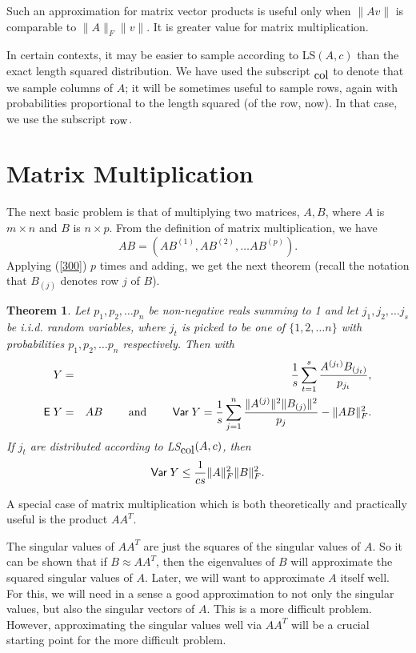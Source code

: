 \documentclass{book}
\newtheorem{theorem}{Theorem}[chapter]
\numberwithin{exercise}{chapter}
\begin{document}
Such an approximation for matrix vector products is useful only when $\|Av\|$ is comparable to
$\|A\|_F\|v\|$. It is greater value for matrix multiplication.

In certain contexts, it may be easier to sample
according to LS$(A,c)$ than the exact length squared distribution. We have used the subscript
$_{\hbox{col}}$ to denote that we sample columns of $A$; it will be sometimes useful to
sample rows, again with probabilities proportional to the length squared (of the row, now).
In that case, we use the subscript $_{\hbox{row}}$.


\section{Matrix Multiplication}

The next basic problem is that of multiplying two matrices, $A,B$, where
$A$ is $m\times n$ and $B$ is $n\times p$. From the definition of matrix multiplication, we have
$$AB=\left( AB^{(1)},AB^{(2)},\ldots AB^{(p)}\right).$$
Applying (\ref{300}) $p$ times and adding, we get the next theorem (recall the notation that
$B_{(j)}$ denotes row $j$ of $B$).
\begin{theorem}\label{matrixmult}
Let $p_1,p_2,\ldots p_n$
be non-negative reals summing to 1 and let $j_1,j_2,\ldots j_s$ be i.i.d. random variables,
where $j_t$ is picked to be one of $\{ 1,2,\ldots n\}$ with probabilities $p_1,p_2,\ldots
p_n$ respectively. Then with
\begin{eqnarray}
Y&=&{1\over s} \sum_{t=1}^s {A^{(j_t)}B_{(j_t)}\over p_{j_t}},\nonumber\\
\hbox{{\sf E}\;} Y&=&AB\qquad \mbox{ and }\qquad \hbox{\sf Var\;} Y= {1\over s}\sum_{j=1}^n {\|A^{(j)}\|^2\|B_{(j)}\|^2\over p_j} - \|AB\|_F^2.\label{400}
\end{eqnarray}
If $j_t$ are distributed according to LS$_{\hbox{col}}(A,c)$, then
$$\hbox{\sf Var\;} Y\leq {1\over cs} \|A\|_F^2\|B\|_F^2.$$
\end{theorem}


A special case of matrix multiplication which is both theoretically and practically useful
is the product $AA^T$.


The singular values of $AA^T$ are just the squares of the singular values
of $A$. So it can be shown that if $B\approx AA^T$, then the eigenvalues of $B$ will approximate the
squared singular values of $A$. Later, we will want to approximate $A$ itself
well. For this, we will need in a sense a good approximation to not only the singular values,
but also the singular vectors of $A$. This is a more difficult problem. However, approximating
the singular values well via $AA^T$ will be a crucial starting point for the more difficult
problem.
\end{document}
